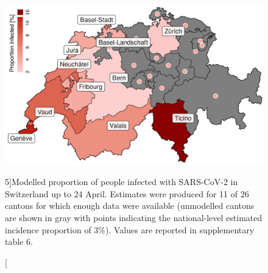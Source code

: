 \begin{figure}\centering
  \includegraphics[width=\textwidth]{fig_covid-switzerland-npi/FIGURE_5_mod.png}
  \caption[Modelled proportion of people infected with SARS-CoV-2 in Switzerland][5\baselineskip]{Modelled proportion of people infected with SARS-CoV-2 in Switzerland up to 24 April. Estimates were produced for 11 of 26 cantons for which enough data were available (unmodelled cantons are shown in gray with points indicating the national-level estimated incidence proportion of 3\%). Values are reported in supplementary table 6.}
  \label{fig:covid-ch-map}
\end{figure}

